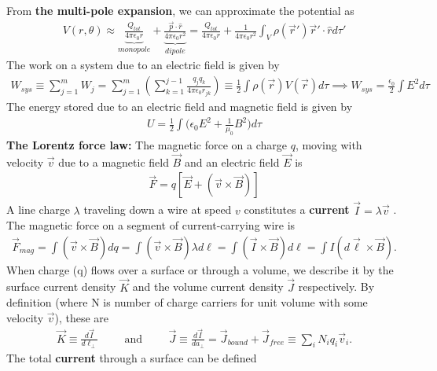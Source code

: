 From \textbf{the multi-pole expansion}, we can approximate the potential as
\begin{align}
	V(r,\theta) \approx \underbrace{\frac{Q_{tot}}{4\pi\epsilon_0 r}}_{monopole} + \underbrace{\frac{\vec{p} \cdot \hat{r}}{4\pi\epsilon_0 r^2}}_{dipole} = \frac{Q_{tot}}{4\pi\epsilon_0 r} + \frac{1}{4\pi\epsilon_0r^2}\int_V \rho(\vec{r}')\vec{r}'\cdot \hat{r} d\tau'
\end{align}
The work on a system due to an electric field is given by
\begin{align}
	W_{sys} \equiv \sum_{j=1}^{m} W_j= \sum_{j=1}^{m} \left(\sum_{k=1}^{j-1} \frac{q_jq_k}{4\pi\epsilon_0r_{jk}}\right) \equiv \frac{1}{2}\int \rho(\vec{r})V(\vec{r})d\tau \implies W_{sys}= \frac{\epsilon_0}{2}\int E^2 d\tau
\end{align}
The energy stored due to an electric field and magnetic field is given by
\begin{align}
	U= \frac{1}{2}\int \bigg(\epsilon_0E^2+\frac{1}{\mu_0}B^2\bigg) d\tau
\end{align}
\textbf{The Lorentz force law:} The magnetic force on a charge $q$, moving with velocity $\vec{v}$ due to a magnetic field $\vec{B}$ and an electric field $\vec{E}$ is
\begin{align}
	\vec{F} = q[\vec{E}+(\vec{v}\times \vec{B})]
\end{align}
A line charge $\lambda$ traveling down a wire at speed $v$ constitutes a \textbf{current} $\vec{I}=\lambda \vec{v}$ \cite{bib:Griffiths}. The magnetic force on a segment of current-carrying wire is
\begin{align}
	\vec{F}_{mag} = \int (\vec{v}\times \vec{B})dq = \int (\vec{v}\times \vec{B})\lambda d\ell = \int (\vec{I}\times \vec{B})d\ell = \int I (d\vec{\ell}\times \vec{B}).
\end{align} 
When charge (q) flows over a surface or through a volume, we describe it by the surface current density $\vec{K}$ and the volume current density $\vec{J}$ respectively. By definition (where N is number of charge carriers for unit volume with some velocity $\vec{v}$), these are
\begin{align}
	\vec{K} \equiv \frac{d\vec{I}}{d\ell_\perp} \hspace{1cm}\textrm{and}\hspace{1cm}\vec{J}\equiv \frac{d\vec{I}}{da_\perp} = \vec{J}_{bound}+\vec{J}_{free} \equiv \sum_{i}N_iq_i\vec{v}_i.
\end{align}
The total \textbf{current} through a surface can be defined
